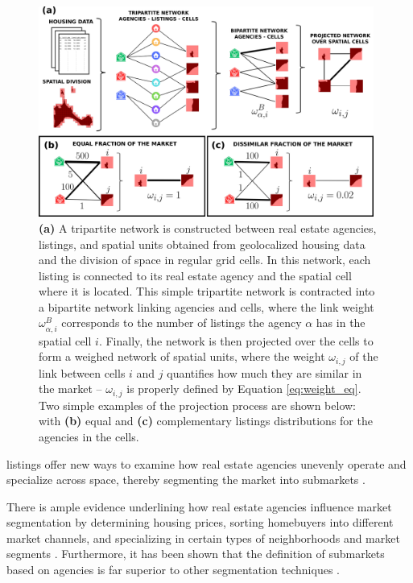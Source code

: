\begin{figure}[ht]
    \label{fig:network_construction}
    \centering
    \includegraphics[width =0.98\textwidth]{Figs/Idealista_segmentation/NETWORK.pdf}
	\caption[Bipartite network construction and projection.]{ \textbf{(a)} A tripartite network is constructed between real estate agencies, listings, and spatial units obtained from geolocalized housing data and the division of space in regular grid cells. In this network, each listing is connected to its real estate agency and the spatial cell where it is located. This simple tripartite network is contracted into a bipartite network linking agencies and cells, where the link weight $\omega^{B}_{\alpha,i}$ corresponds to the number of listings the agency $\alpha$ has in the spatial cell $i$. Finally, the network is then projected over the cells to form a weighed network of spatial units, where the weight $\omega_{i,j}$ of the link between cells $i$ and $j$ quantifies how much they are similar in the market -- $\omega_{i,j}$ is properly defined by Equation \eqref{eq:weight_eq}. Two simple examples of the projection process are shown below: with \textbf{(b)} equal and \textbf{(c)} complementary listings distributions for the agencies in the cells. }
\end{figure}
listings offer new ways to examine how real estate agencies unevenly operate and specialize across space, thereby segmenting the market into submarkets \cite{palm1976RealEstate}.


There is ample evidence underlining how real estate agencies influence market segmentation by determining housing prices, sorting homebuyers into different market channels, and specializing in certain types of neighborhoods and market segments \cite{palm1976RealEstate,palm1978spatial,keskin2017defining,bonneval2017agents,besbris2017investigating}. Furthermore, it has been shown that the definition of submarkets based on agencies is far superior to other segmentation techniques \cite{leishman2013PredictivePerformance}. 

